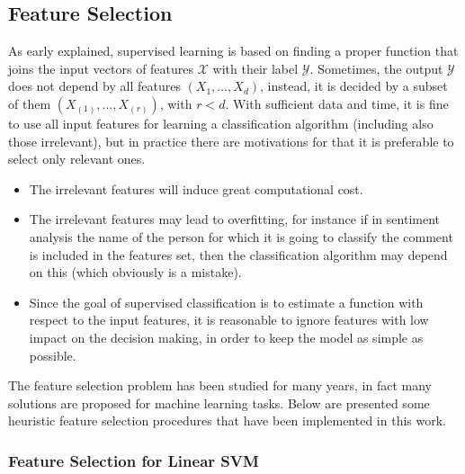 \subsection{Feature Selection}

As early explained, supervised learning is based on finding a proper function that joins the input vectors of features $\mathcal{X}$ with their label $\mathcal{Y}$. Sometimes, the output $\mathcal{Y}$ does not depend by all features $(X_1, \dots, X_d)$, instead, it is decided by a subset of them $(X_{(1)}, \dots, X_{(r)})$, with $r<d$. With sufficient data and time, it is fine to use all input features for learning a classification algorithm (including also those irrelevant), but in practice there are motivations for that it is preferable to select only relevant ones.\\

\begin{itemize}
	\item The irrelevant features will induce great computational cost. 
	\item The irrelevant features may lead to overfitting, for instance if in sentiment analysis the name of the person for which it is going to classify the comment is included in the features set, then the classification algorithm may depend on this (which obviously is a mistake).
	\item Since the goal of supervised classification is to estimate a function with respect to the input features, it is reasonable to ignore features with low impact on the decision making, in order to keep the model as simple as possible.
\end{itemize}

The feature selection problem has been studied for many years, in fact many solutions are proposed for machine learning tasks. Below are presented some heuristic feature selection procedures that have been implemented in this work.


\subsubsection{Feature Selection for Linear SVM}


